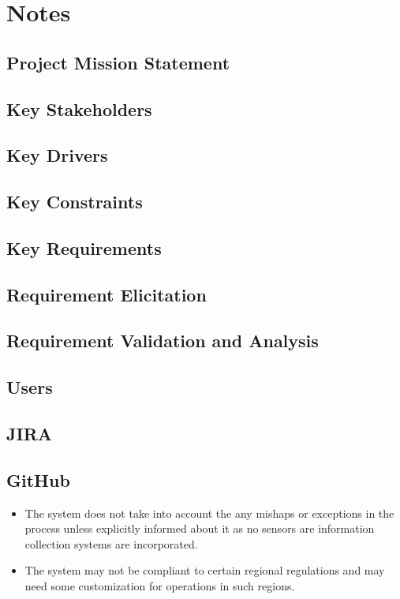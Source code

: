 \chapter{Notes \\ 
\label{Chapter::Notes}}

\section{Project Mission Statement \label{Section::projectmissionstatement}}
\section{Key Stakeholders \label{Section::keystakeholders}}
\section{Key Drivers \label{Section::keydrivers}}
\section{Key Constraints \label{Section::keyconstraints}}
\section{Key Requirements \label{Section::keyrequirements}}
\section{Requirement Elicitation \label{Section::requirementelicitation}}
\section{Requirement Validation and Analysis \label{Section::requirementvalidationandanalysis}}
\section{Users \label{Section::users}}
\section{JIRA \label{Section::jira}}
\section{GitHub \label{Section::github}}
\begin{itemize}    
    \item The system does not take into account the any mishaps or exceptions in the process unless explicitly informed about it as no sensors are information collection systems are incorporated.
    \item The system may not be compliant to certain regional regulations and may need some customization for operations in such regions.
\end{itemize}